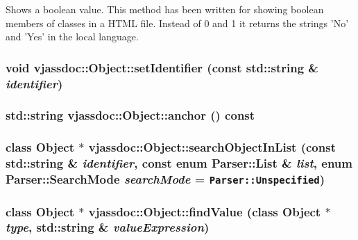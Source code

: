 Shows a boolean value. This method has been written for showing boolean members of classes in a HTML file. Instead of 0 and 1 it returns the strings 'No' and 'Yes' in the local language. \hypertarget{classvjassdoc_1_1Object_3b69e9dd345029eef00edd37b4b171df}{
\subsubsection{\setlength{\rightskip}{0pt plus 5cm}void vjassdoc::Object::setIdentifier (const std::string \& {\em identifier})}}
\label{classvjassdoc_1_1Object_3b69e9dd345029eef00edd37b4b171df}


\hypertarget{classvjassdoc_1_1Object_6ccc2dac8089947b3ad04b306ea700e8}{
\subsubsection{\setlength{\rightskip}{0pt plus 5cm}std::string vjassdoc::Object::anchor () const}}
\label{classvjassdoc_1_1Object_6ccc2dac8089947b3ad04b306ea700e8}


\hypertarget{classvjassdoc_1_1Object_7ec73267fcaaa923333318c63de594da}{
\subsubsection{\setlength{\rightskip}{0pt plus 5cm}class {\bf Object} $\ast$ vjassdoc::Object::searchObjectInList (const std::string \& {\em identifier}, const enum {\bf Parser::List} \& {\em list}, enum {\bf Parser::SearchMode} {\em searchMode} = {\tt Parser::Unspecified})}}
\label{classvjassdoc_1_1Object_7ec73267fcaaa923333318c63de594da}


\hypertarget{classvjassdoc_1_1Object_4204a70565df779213ae78612560d42e}{
\subsubsection{\setlength{\rightskip}{0pt plus 5cm}class {\bf Object} $\ast$ vjassdoc::Object::findValue (class {\bf Object} $\ast$ {\em type}, std::string \& {\em valueExpression})}}
\label{classvjassdoc_1_1Object_4204a70565df779213ae78612560d42e}


